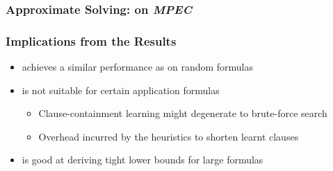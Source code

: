 \begin{frame}
    \frametitle{Approximate Solving: \erssatb on \textit{MPEC}}
    \begin{table}[ht]
        \centering
        \scriptsize
    \end{table}
\end{frame}

\begin{frame}
    \frametitle{Implications from the Results}
    \begin{itemize}
        \item \erssat achieves a similar performance as \dcssat on random formulas
              \pause
        \item \erssat is not suitable for certain application formulas
              \pause
              \begin{itemize}
                  \item Clause-containment learning might degenerate to brute-force search
                        \pause
                  \item Overhead incurred by the heuristics to shorten learnt clauses
                        \pause
              \end{itemize}
        \item \erssat is good at deriving tight lower bounds for large formulas
    \end{itemize}
\end{frame}